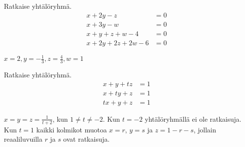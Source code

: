 \begin{tehtavasivu}
\begin{tehtava}
	Ratkaise yhtälöryhmä.
	\begin{align*}
		x+2y-z &= 0 \\
		x+3y-w &= 0 \\
		x+y+z+w-4 & = 0 \\
		x+2y+2z+2w-6 &= 0
	\end{align*}
	\begin{vastaus}
		$x=2, y=-\frac13, z=\frac43, w=1$
	\end{vastaus}
\end{tehtava}

\begin{tehtava}
	Ratkaise yhtälöryhmä.
    	\begin{align*}
        	x+y+tz &=1 \\
        	x+ty+z &=1 \\
        	tx+y+z &=1
    	\end{align*}
	\begin{vastaus}
		$x = y = z = \frac{1}{t+2}$, kun $1 \neq t \neq -2$. Kun $t = -2$ yhtälöryhmällä ei ole ratkaisuja.
		Kun $t = 1$ kaikki kolmikot muotoa $x = r$, $y = s$ ja $z = 1-r-s$, jollain reaaliluvuilla $r$ ja $s$ ovat ratkaisuja.
	\end{vastaus}
\end{tehtava}


\end{tehtavasivu}
